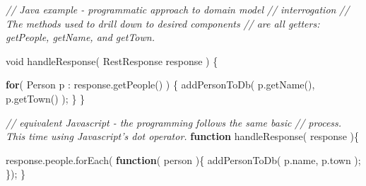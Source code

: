 \documentclass[12pt, ]{article}
\newenvironment{Shaded}{}{}
\newcommand{\KeywordTok}[1]{\textcolor[rgb]{0.00,0.44,0.13}{\textbf{{#1}}}}
\newcommand{\DataTypeTok}[1]{\textcolor[rgb]{0.56,0.13,0.00}{{#1}}}
\newcommand{\CommentTok}[1]{\textcolor[rgb]{0.38,0.63,0.69}{\textit{{#1}}}}
\newcommand{\OtherTok}[1]{\textcolor[rgb]{0.00,0.44,0.13}{{#1}}}
\newcommand{\FunctionTok}[1]{\textcolor[rgb]{0.02,0.16,0.49}{{#1}}}
\newcommand{\NormalTok}[1]{{#1}}
\begin{document}
\begin{Shaded}
\begin{Highlighting}[]
\CommentTok{// Java example - programmatic approach to domain model }
\CommentTok{// interrogation}
\CommentTok{// The methods used to drill down to desired components }
\CommentTok{// are all getters: getPeople, getName, and getTown.}
 
\DataTypeTok{void} \FunctionTok{handleResponse}\NormalTok{( RestResponse response ) \{}

   \KeywordTok{for}\NormalTok{( Person p : response.}\FunctionTok{getPeople}\NormalTok{() ) \{}
      \FunctionTok{addPersonToDb}\NormalTok{( p.}\FunctionTok{getName}\NormalTok{(), p.}\FunctionTok{getTown}\NormalTok{() );}
   \NormalTok{\}   }
\NormalTok{\}}
\end{Highlighting}
\end{Shaded}

\begin{Shaded}
\begin{Highlighting}[]
\CommentTok{// equivalent Javascript - the programming follows the same basic}
\CommentTok{// process. This time using Javascript's dot operator.}
\KeywordTok{function} \FunctionTok{handleResponse}\NormalTok{( response )\{}

   \OtherTok{response}\NormalTok{.}\OtherTok{people}\NormalTok{.}\FunctionTok{forEach}\NormalTok{( }\KeywordTok{function}\NormalTok{( person )\{}
      \FunctionTok{addPersonToDb}\NormalTok{( }\OtherTok{p}\NormalTok{.}\FunctionTok{name}\NormalTok{, }\OtherTok{p}\NormalTok{.}\FunctionTok{town} \NormalTok{);}
   \NormalTok{\});}
\NormalTok{\}}
\end{Highlighting}
\end{Shaded}
\end{document}
